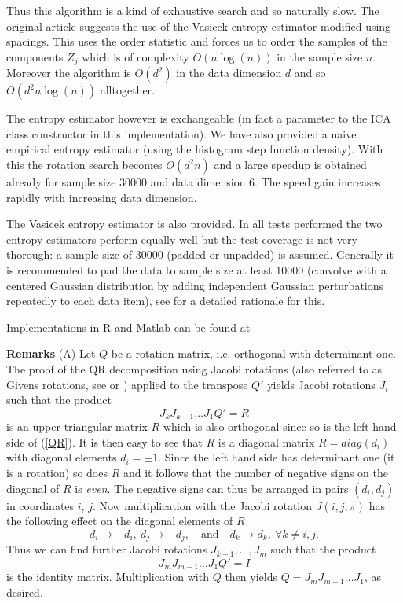\documentclass[
10pt,
fleqn,
nosumlimits,
nointlimits,
nonamelimits
]
{article}
\begin{document}
Thus this algorithm is a kind of exhaustive search and so naturally slow.
The original article \cite{MilFish} suggests the use of the Vasicek entropy estimator modified using spacings.
This uses the order statistic and forces us to order the samples of the components $Z_j$ which is of complexity
$O(n\log(n))$ in the sample size $n$. Moreover the algorithm is $O(d^2)$ in the data dimension $d$ and so
$O(d^2n\log(n))$ alltogether.

The entropy estimator however is exchangeable (in fact a parameter to the ICA class constructor in this implementation). 
We have also provided a naive empirical entropy estimator (using the histogram step function density). 
With this the rotation search becomes $O(d^2n)$ and a large speedup is obtained already for sample size 30000
and data dimension 6. The speed gain increases rapidly with increasing data dimension.

The Vasicek entropy estimator is also provided. In all tests performed the two entropy estimators perform 
equally well but the test coverage is not very thorough: a sample size of 30000 (padded or unpadded) is assumed.
Generally it is recommended to pad the data to sample size at least 10000 (convolve with a centered Gaussian 
distribution by adding independent Gaussian perturbations repeatedly to each data item), see \cite{MilFish} for a
detailed rationale for this.

\noindent
Implementations in R and Matlab can be found at \cite{radical_ica}

\vfill\eject\noindent
\textbf{Remarks} 
(A) Let $Q$ be a rotation matrix, i.e. orthogonal with determinant one. The proof of the QR decomposition
using Jacobi rotations (also referred to as Givens rotations, see \cite{QR_ox} or \cite{QR_berk}) applied 
to the transpose $Q'$ yields Jacobi rotations $J_i$ such that the product
%
\begin{equation}
\label{QR}
J_kJ_{k-1}\dots J_1Q'=R 
\end{equation}
%
is an upper triangular matrix $R$ which is also orthogonal since so is the left hand side of (\ref{QR}).
It is then easy to see that $R$ is a diagonal matrix $R=diag(d_i)$ with diagonal elements $d_i=\pm1$.
Since the left hand side has determinant one (it is a rotation) so does $R$ and it follows that the number
of negative signs on the diagonal of $R$ is \textit{even}. The negative signs can thus be arranged in pairs
$(d_i,d_j)$ in coordinates $i$, $j$. Now multiplication with the Jacobi rotation $J(i,j,\pi)$ has the following 
effect on the diagonal elements of $R$
$$
d_i\rightarrow -d_i,\ d_j\rightarrow -d_j,\quad\text{and}\quad d_k\rightarrow d_k,\ \forall k\neq i,j. 
$$
Thus we can find further Jacobi rotations $J_{k+1},\dots,J_m$ such that the product
$$
J_mJ_{m-1}\dots J_1Q'=I
$$
is the identity matrix. Multiplication with $Q$ then yields $Q=J_mJ_{m-1}\dots J_1$, as desired.
\end{document}
